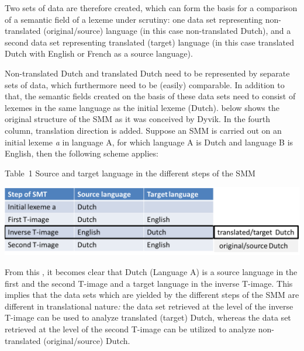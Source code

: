 Two sets of data are therefore created, which can form the basis for a comparison of a semantic field of a lexeme under scrutiny: one data set representing non-translated (original/source) language (in this case non-translated Dutch), and a second data set representing translated (target) language (in this case translated Dutch with English or French as a source language).



Non-translated Dutch and translated Dutch need to be represented by separate sets of data, which furthermore need to be (easily) comparable. In addition to that, the semantic fields created on the basis of these data sets need to consist of lexemes in the same language as the initial lexeme (Dutch).  below shows the original structure of the SMM as it was conceived by Dyvik. In the fourth column, translation direction is added. Suppose an SMM is carried out on an initial lexeme \textit{a} in language A, for which language A is Dutch and language B is English, then the following scheme applies:


\begin{table}\caption{
Table~1  Source and target language in the different steps of the SMM
}
\label{tab:key:}
\includegraphics[height=.3\textheight]{figures/Vandevoorde2-img14.png}
\end{table}
  

From this , it becomes clear that Dutch (Language A) is a source language in the first and the second T-image and a target language in the inverse T-image. This implies that the data sets which are yielded by the different steps of the SMM are different in translational nature\textit{:} the data set retrieved at the level of the inverse T-image can be used to analyze translated (target) Dutch, whereas the data set retrieved at the level of the second T-image can be utilized to analyze non-translated (original/source) Dutch.



